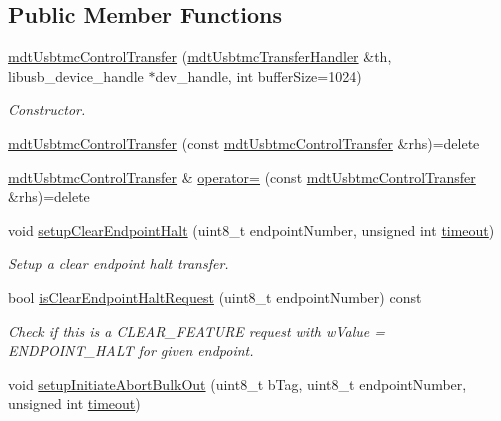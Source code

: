 \subsection*{Public Member Functions}
\begin{DoxyCompactItemize}
\item 
\hyperlink{classmdt_usbtmc_control_transfer_a2d17061cfab461e3a103a9b97a813bfd}{mdt\-Usbtmc\-Control\-Transfer} (\hyperlink{classmdt_usbtmc_transfer_handler}{mdt\-Usbtmc\-Transfer\-Handler} \&th, libusb\-\_\-device\-\_\-handle $\ast$dev\-\_\-handle, int buffer\-Size=1024)
\begin{DoxyCompactList}\small\item\em Constructor. \end{DoxyCompactList}\item 
\hyperlink{classmdt_usbtmc_control_transfer_a500d4462ebf54558c384c120a16f1059}{mdt\-Usbtmc\-Control\-Transfer} (const \hyperlink{classmdt_usbtmc_control_transfer}{mdt\-Usbtmc\-Control\-Transfer} \&rhs)=delete
\item 
\hyperlink{classmdt_usbtmc_control_transfer}{mdt\-Usbtmc\-Control\-Transfer} \& \hyperlink{classmdt_usbtmc_control_transfer_af3f3cef9aee3400b67fd6c404322087d}{operator=} (const \hyperlink{classmdt_usbtmc_control_transfer}{mdt\-Usbtmc\-Control\-Transfer} \&rhs)=delete
\item 
void \hyperlink{classmdt_usbtmc_control_transfer_a643310e1bcb2c76faca498720a20e938}{setup\-Clear\-Endpoint\-Halt} (uint8\-\_\-t endpoint\-Number, unsigned int \hyperlink{classmdt_usb_transfer_a3262511f6062348132e7ee689c24226c}{timeout})
\begin{DoxyCompactList}\small\item\em Setup a clear endpoint halt transfer. \end{DoxyCompactList}\item 
bool \hyperlink{classmdt_usbtmc_control_transfer_a0dbcbeb3f867150af3458dcdb83ef6ea}{is\-Clear\-Endpoint\-Halt\-Request} (uint8\-\_\-t endpoint\-Number) const 
\begin{DoxyCompactList}\small\item\em Check if this is a C\-L\-E\-A\-R\-\_\-\-F\-E\-A\-T\-U\-R\-E request with w\-Value = E\-N\-D\-P\-O\-I\-N\-T\-\_\-\-H\-A\-L\-T for given endpoint. \end{DoxyCompactList}\item 
void \hyperlink{classmdt_usbtmc_control_transfer_a08efe6be130e0ea84c99c4225f5c62d1}{setup\-Initiate\-Abort\-Bulk\-Out} (uint8\-\_\-t b\-Tag, uint8\-\_\-t endpoint\-Number, unsigned int \hyperlink{classmdt_usb_transfer_a3262511f6062348132e7ee689c24226c}{timeout})

\end{DoxyCompactItemize}
